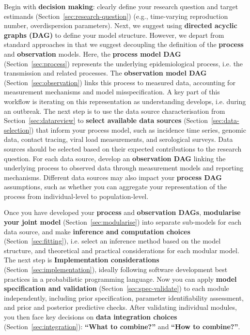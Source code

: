 \documentclass{article}
\begin{document}
Begin with \textbf{decision making}: clearly define your research question and target estimands (Section~\ref{sec:research-question}) (e.g., time-varying reproduction number, overdispersion parameters).
Next, we suggest using \textbf{directed acyclic graphs (DAG)}  to define your model structure. However, we depart from standard approaches in that we suggest decoupling the definition of the \textbf{process} and \textbf{observation} models.
Here, the \textbf{process model DAG} (Section~\ref{sec:process}) represents the underlying epidemiological process, i.e. the transmission and related processes.
The \textbf{observation model DAG} (Section~\ref{sec:observation}) links this process to measured data, accounting for measurement mechanisms and model misspecification.
A key part of this workflow is iterating on this representation as understanding develops, i.e. during an outbreak.
The next step is to use the data source characterisation from Section~\ref{sec:datareview} to \textbf{select available data sources} (Section~\ref{sec:data-selection}) that inform your process model, such as incidence time series, genomic data, contact tracing, viral load measurements, and serological surveys.
Data sources should be selected based on their expected contributions to the research question.
For each data source, develop an \textbf{observation DAG} linking the underlying process to observed data through measurement models and reporting mechanisms.
Different data sources may also impact your \textbf{process DAG} assumptions, such as whether you can aggregate your representation of the process from individual-level to population-level.

Once you have developed your \textbf{process} and \textbf{observation DAGs}, \textbf{modularise your joint model} (Section~\ref{sec:modularise}) into separate sub-models for each data source, and make \textbf{inference and computation choices} (Section~\ref{sec:fitting}), i.e. select an inference method based on the model structure, and theoretical and practical considerations for each modular model.
The next step is \textbf{Implementation considerations} (Section~\ref{sec:implementation}), ideally following software development best practices in a probabilistic programming language.
Now you can apply \textbf{model specification and validation} (Section~\ref{sec:spec-validate}) to each module independently, including prior specification, parameter identifiability assessment, and prior and posterior predictive checks.
After validating individual modules, you then face key decisions on \textbf{data integration choices} (Section~\ref{sec:integration}): \textbf{``What to combine?''} and \textbf{``How to combine?''}.
\end{document}
